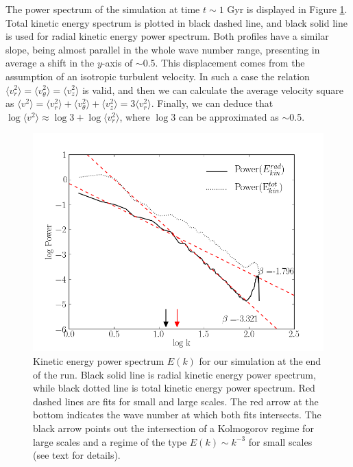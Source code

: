 \documentclass[twocolumn]{aastex}
\begin{document}
The power spectrum of the simulation at time $t \sim 1$ Gyr is displayed in Figure \ref{fig:ps}. Total kinetic energy spectrum is plotted in black dashed line, and black solid line is used for radial kinetic energy power spectrum. Both profiles have a similar slope, being almost parallel in the whole wave number range, presenting in average a shift in the $y$-axis of $\sim$0.5. This displacement comes from the assumption of an isotropic turbulent velocity. In such a case the relation $\langle v^2_r\rangle = \langle v^2_\theta\rangle = \langle v^2_z\rangle$ is valid, and then we can calculate the average velocity square as $\langle v^2\rangle = \langle v^2_r\rangle + \langle v^2_\theta\rangle + \langle v^2_z\rangle = 3\langle v^2_r\rangle$. Finally, we can deduce that $\log{\langle v^2\rangle} \approx \log{3} + \log{\langle v^2_r\rangle}$, where $\log{3}$ can be approximated as $\sim$0.5.
	
	\begin{figure}[h!]
	\begin{center}
	\includegraphics[scale=0.5]{./f6.png}
	\caption{Kinetic energy power spectrum $E(k)$ for our simulation at the end of the run. Black solid line is radial kinetic energy power spectrum, while black dotted line is total kinetic energy power spectrum. Red dashed lines are fits for small and large scales. The red arrow at the bottom indicates the wave number at which both fits intersects. The black arrow points out the intersection of a Kolmogorov regime for large scales and a regime of the type $E(k) \sim k^{-3}$ for small scales (see text for details).}
	\label{fig:ps}
	\end{center}
	\end{figure}
\end{document}
